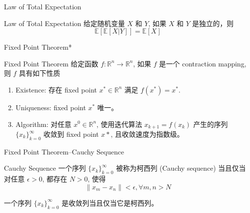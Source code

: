 \documentclass[aspectratio=169]{beamer}
\begin{document}
\appendix

\begin{frame}[label=law-of-total-expectation]{Law of Total Expectation}
    \begin{block}{Law of Total Expectation}
        给定随机变量 $X$ 和 $Y$, 如果 $X$ 和 $Y$ 是独立的，则
        \begin{equation}
            \mathbb{E}[\mathbb{E}[X|Y]] = \mathbb{E}[X]
        \end{equation}
    \end{block}
\end{frame}

\begin{frame}[label=fixed-point-theorem]{Fixed Point Theorem*}
    \begin{block}{Fixed Point Theorem}
        给定函数 $f:\mathbb{R}^n\to\mathbb{R}^n$, 如果 $f$ 是一个 contraction mapping, 则 $f$ 具有如下性质
        \begin{enumerate}
            \item Existence: 存在 fixed point $x^*\in\mathbb{R}^n$ 满足 $f(x^*)=x^*$.
            \item Uniqueness: fixed point $x^*$ 唯一。
            \item Algorithm: 对任意 $x^0\in\mathbb{R}^n$, 使用迭代算法 $x_{k+1}=f(x_k)$ 产生的序列 $\{x_k\}_{k=0}^{\infty}$ 收敛到 fixed point $x*$, 且收敛速度为指数级。
        \end{enumerate}
    \end{block}
\end{frame}

\begin{frame}{Fixed Point Theorem--Cauchy Sequence}
    \begin{block}{Cauchy Sequence}
        一个序列 $\{x_k\}_{k=0}^{\infty}$ 被称为柯西列 (Cauchy sequence) 当且仅当对任意 $\epsilon>0$, 都存在 $N>0$, 使得
        \begin{equation}
            \|x_m-x_n\| <\epsilon,\forall m, n>N
        \end{equation}
    \end{block}

    \begin{theorem}
        一个序列 $\{x_k\}_{k=0}^{\infty}$ 是收敛列当且仅当它是柯西列。
    \end{theorem}
\end{frame}
\end{document}
